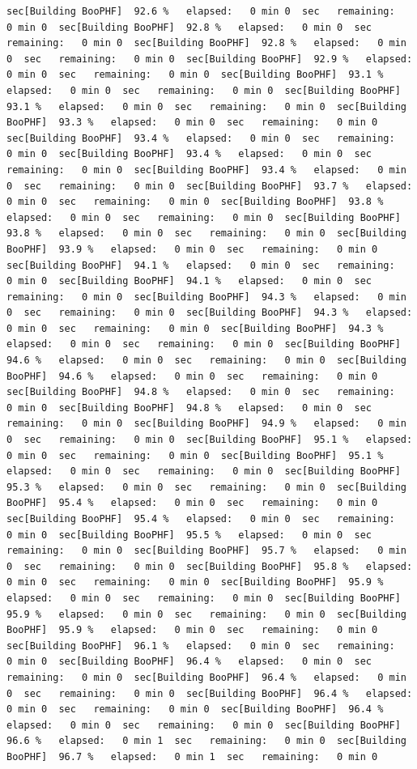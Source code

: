 \documentclass[
]{book}
\begin{document}
\begin{verbatim}
sec[Building BooPHF]  92.6 %   elapsed:   0 min 0  sec   remaining:   0 min 0  sec[Building BooPHF]  92.8 %   elapsed:   0 min 0  sec   remaining:   0 min 0  sec[Building BooPHF]  92.8 %   elapsed:   0 min 0  sec   remaining:   0 min 0  sec[Building BooPHF]  92.9 %   elapsed:   0 min 0  sec   remaining:   0 min 0  sec[Building BooPHF]  93.1 %   elapsed:   0 min 0  sec   remaining:   0 min 0  sec[Building BooPHF]  93.1 %   elapsed:   0 min 0  sec   remaining:   0 min 0  sec[Building BooPHF]  93.3 %   elapsed:   0 min 0  sec   remaining:   0 min 0  sec[Building BooPHF]  93.4 %   elapsed:   0 min 0  sec   remaining:   0 min 0  sec[Building BooPHF]  93.4 %   elapsed:   0 min 0  sec   remaining:   0 min 0  sec[Building BooPHF]  93.4 %   elapsed:   0 min 0  sec   remaining:   0 min 0  sec[Building BooPHF]  93.7 %   elapsed:   0 min 0  sec   remaining:   0 min 0  sec[Building BooPHF]  93.8 %   elapsed:   0 min 0  sec   remaining:   0 min 0  sec[Building BooPHF]  93.8 %   elapsed:   0 min 0  sec   remaining:   0 min 0  sec[Building BooPHF]  93.9 %   elapsed:   0 min 0  sec   remaining:   0 min 0  sec[Building BooPHF]  94.1 %   elapsed:   0 min 0  sec   remaining:   0 min 0  sec[Building BooPHF]  94.1 %   elapsed:   0 min 0  sec   remaining:   0 min 0  sec[Building BooPHF]  94.3 %   elapsed:   0 min 0  sec   remaining:   0 min 0  sec[Building BooPHF]  94.3 %   elapsed:   0 min 0  sec   remaining:   0 min 0  sec[Building BooPHF]  94.3 %   elapsed:   0 min 0  sec   remaining:   0 min 0  sec[Building BooPHF]  94.6 %   elapsed:   0 min 0  sec   remaining:   0 min 0  sec[Building BooPHF]  94.6 %   elapsed:   0 min 0  sec   remaining:   0 min 0  sec[Building BooPHF]  94.8 %   elapsed:   0 min 0  sec   remaining:   0 min 0  sec[Building BooPHF]  94.8 %   elapsed:   0 min 0  sec   remaining:   0 min 0  sec[Building BooPHF]  94.9 %   elapsed:   0 min 0  sec   remaining:   0 min 0  sec[Building BooPHF]  95.1 %   elapsed:   0 min 0  sec   remaining:   0 min 0  sec[Building BooPHF]  95.1 %   elapsed:   0 min 0  sec   remaining:   0 min 0  sec[Building BooPHF]  95.3 %   elapsed:   0 min 0  sec   remaining:   0 min 0  sec[Building BooPHF]  95.4 %   elapsed:   0 min 0  sec   remaining:   0 min 0  sec[Building BooPHF]  95.4 %   elapsed:   0 min 0  sec   remaining:   0 min 0  sec[Building BooPHF]  95.5 %   elapsed:   0 min 0  sec   remaining:   0 min 0  sec[Building BooPHF]  95.7 %   elapsed:   0 min 0  sec   remaining:   0 min 0  sec[Building BooPHF]  95.8 %   elapsed:   0 min 0  sec   remaining:   0 min 0  sec[Building BooPHF]  95.9 %   elapsed:   0 min 0  sec   remaining:   0 min 0  sec[Building BooPHF]  95.9 %   elapsed:   0 min 0  sec   remaining:   0 min 0  sec[Building BooPHF]  95.9 %   elapsed:   0 min 0  sec   remaining:   0 min 0  sec[Building BooPHF]  96.1 %   elapsed:   0 min 0  sec   remaining:   0 min 0  sec[Building BooPHF]  96.4 %   elapsed:   0 min 0  sec   remaining:   0 min 0  sec[Building BooPHF]  96.4 %   elapsed:   0 min 0  sec   remaining:   0 min 0  sec[Building BooPHF]  96.4 %   elapsed:   0 min 0  sec   remaining:   0 min 0  sec[Building BooPHF]  96.4 %   elapsed:   0 min 0  sec   remaining:   0 min 0  sec[Building BooPHF]  96.6 %   elapsed:   0 min 1  sec   remaining:   0 min 0  sec[Building BooPHF]  96.7 %   elapsed:   0 min 1  sec   remaining:   0 min 0  
\end{verbatim}
\end{document}

